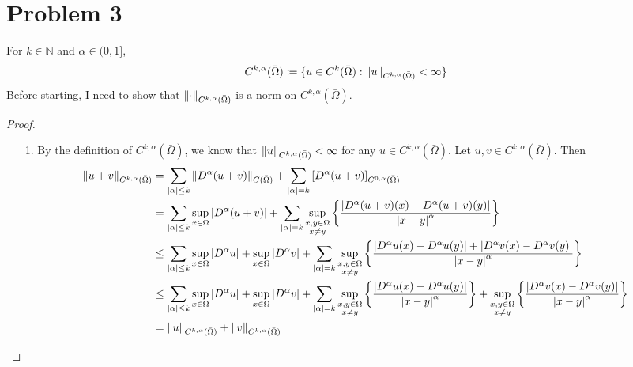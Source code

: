 \documentclass{article}
\begin{document}
\section*{Problem 3}
For $k\in \mathbb{N}$ and $\alpha\in(0,1]$,
\begin{equation*}
C^{k,\alpha}(\bar{\Omega})\coloneqq \{u\in C^{k}(\bar{\Omega}):\norm{u}_{C^{k,\alpha}(\bar{\Omega})}<\infty\}
\end{equation*}
Before starting, I need to show that $\norm{\cdot}_{C^{k,\alpha}(\bar{\Omega})}$ is a norm on ${C^{k,\alpha}(\bar{\Omega})}$.
\begin{proof}
\begin{enumerate}
\item[1.] By the definition of ${C^{k,\alpha}(\bar{\Omega})}$, we know that $\norm{u}_{C^{k,\alpha}(\bar{\Omega})}< \infty$ for any $u\in{C^{k,\alpha}(\bar{\Omega})}$. Let $u,v\in {C^{k,\alpha}(\bar{\Omega})}$. Then
\begin{equation*}
\begin{split}
\norm{u+v}_{C^{k,\alpha}(\bar{\Omega})}&=\sum\limits_{\abs{\alpha}\leq k}\norm{D^\alpha (u+v)}_{C(\bar{\Omega})}+\sum\limits_{\abs{\alpha}=k}\left[D^\alpha (u+v)\right]_{C^{0, \alpha}(\bar{\Omega})} \\
&=\sum\limits_{\abs{\alpha}\leq k}\sup_{x\in \Omega}\abs{D^\alpha (u+v)}+\sum\limits_{\abs{\alpha}=k}\sup_{\substack{x,y\in \Omega \\ x\neq y}} \left\{  \frac{\abs{D^\alpha (u+v)(x)-D^\alpha (u+v)(y)}}{\abs{x-y}^\alpha}\right\} \\
&\leq \sum\limits_{\abs{\alpha}\leq k}\sup_{x\in \Omega}\abs{D^\alpha u}+\sup_{x\in \Omega}\abs{D^\alpha v}+\sum\limits_{\abs{\alpha}=k}\sup_{\substack{x,y\in \Omega \\ x\neq y}} \left\{  \frac{\abs{D^\alpha u(x)-D^\alpha u(y)}+\abs{D^\alpha v(x)-D^\alpha v(y)}}{\abs{x-y}^\alpha}\right\} \\
&\leq \sum\limits_{\abs{\alpha}\leq k}\sup_{x\in \Omega}\abs{D^\alpha u}+\sup_{x\in \Omega}\abs{D^\alpha v}+\sum\limits_{\abs{\alpha}=k}\sup_{\substack{x,y\in \Omega \\ x\neq y}} \left\{  \frac{\abs{D^\alpha u(x)-D^\alpha u(y)}}{{\abs{x-y}^\alpha}}\right\}+\sup_{\substack{x,y\in \Omega \\ x\neq y}}\left\{  \frac{\abs{D^\alpha v(x)-D^\alpha v(y)}}{{\abs{x-y}^\alpha}}\right\} \\
&=\norm{u}_{C^{k,\alpha}(\bar{\Omega})}+\norm{v}_{C^{k,\alpha}(\bar{\Omega})}
\end{split}

\end{equation*}
\end{enumerate}
\end{proof}
\end{document}
